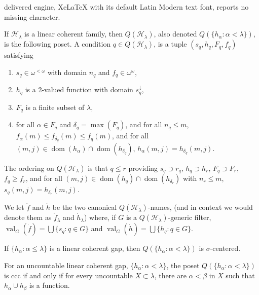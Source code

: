 \documentclass[10pt,a4paper]{amsart}
\def\dom{\operatorname{dom}}
\def\val{\operatorname{val}}
\begin{document}
delivered engine, XeLaTeX with its default Latin Modern text font, reports no missing character.
\begin{definition}  If $\mathcal H_\lambda$ is a linear\label{defcoherent} coherent family, 
then $Q(\mathcal H_\lambda)$, also denoted   $Q(\{ h_\alpha : \alpha < \lambda\})$,
is the following poset. A condition $q\in Q(\mathcal H_\lambda)$, is
 a tuple $(s_q, h_q, F_q, f_q)$ satisfying 
 \begin{enumerate}
\item   $s_q\in \omega^{<\omega}$ with domain $n_q$ and $f_q\in \omega^\omega$,
\item $h_q $  is a 2-valued  function with domain  $s_q^\downarrow $,
 \item   $F_q$ is a finite subset of $\lambda$,
 \item for all $\alpha\in F_q$ and $\delta_q = \max(F_q)$,
 and for all $n_q\leq m$,
  $f_\alpha(m)\leq f_{\delta_q}(m) \leq f_q(m)$,
  and for all $(m,j)\in \dom(h_\alpha)\cap \dom(h_{\delta_q})$,
  $h_\alpha(m,j) = h_{\delta_q}(m,j)$.
 \end{enumerate}
 The ordering on $Q(\mathcal H_\lambda)$ is that $q\leq r$
 providing $s_q\supset r_q$, $h_q\supset h_r$, $F_q\supset F_r$,
  $f_q\geq f_r$, and for all $(m,j)\in \dom(h_q)\cap \dom(h_{\delta_r})$
  with $n_r\leq m$, $s_q(m,j) = h_{\delta_r}(m,j)$. 

  We let $\dot f$ and $\dot h$ be the two canonical $Q(\mathcal H_\lambda)$-names,
    (and in context we would  denote them as $\dot f_\lambda$ and $\dot h_\lambda$)
    where, if $G$ is a $Q(\mathcal H_\lambda)$-generic filter,
     $\val_{G}(\dot f) = \bigcup \{ s_q : q\in G\}$
     and $\val_{G}(\dot h) = \bigcup\{ h_q : q\in G\}$. 
\end{definition}

\begin{corollary}  If $\{ h_\alpha : \alpha \leq  \lambda\}$ 
is a linear coherent gap, then\label{successor} 
 $Q(\{ h_\alpha : \alpha < \lambda\})$ is $\sigma$-centered. 
\end{corollary}

  \begin{lemma} For  an uncountable\label{cccequivalent}
  linear coherent gap, $\{ h_\alpha : \alpha<\lambda\}$,
the poset   $  Q(\{ h_\alpha :\alpha < \lambda\})$ is ccc 
if and only if 
for every uncountable $X\subset\lambda$, there are
$\alpha< \beta$ in $X$ such that $h_\alpha\cup h_\beta$ is a function.
  \end{lemma}
\end{document}
